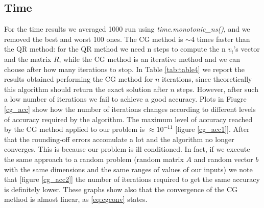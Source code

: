 \documentclass{article}
\begin{document}
\subsection{Time}\label{subsec:time}
For the time results we averaged 1000 run using \textit{time.monotonic\_ns()}, and we removed the best and worst 100 ones.
The CG method is $\sim 4$ times faster than the QR method: for the QR method we need n steps to compute the n $v_{i}$'s vector and the matrix $R$, while the CG method is an iterative method and we can choose after how many iterations to stop. In Table \ref{tab:table4} we report the results obtained performing the CG method for $n$ iterations, since theoretically this algorithm should return the exact solution after $n$ steps. However, after such a low number of iterations we fail to achieve a good accuracy. Plots in Fiugre \ref{cg_acc} show how the number of iterations changes according to different levels of accuracy required by the algorithm. The maximum level of accuracy reached by the CG method applied to our problem is $\approx 10^{-11}$ [figure \ref{cg_acc1}]. After that the rounding-off errors accomulate a lot and the algorithm no longer converges. This is because our problem is ill conditioned. In fact, if we execute the same approach to a random problem (random matrix $A$ and random vector $b$ with the same dimensions and the same ranges of values of our inputs) we note that [figure \ref{cg_acc2}] the number of iterations required to get the same accuracy is definitely lower. These graphs show also that the convergence of the CG method is almost linear, as \eqref{eq:cgconv} states.
\end{document}
